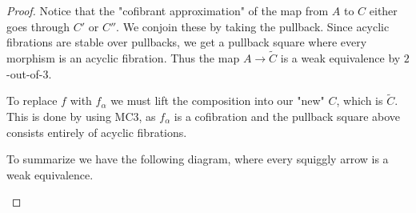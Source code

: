 \documentclass[../thesis.tex]{subfiles}
\begin{document}
\begin{proof}
                Notice that the "cofibrant approximation" of the map from $A$ to $C$ either goes through $C'$ or $C''$. We conjoin these by taking the pullback. Since acyclic fibrations are stable over pullbacks, we get a pullback square where every morphism is an acyclic fibration. Thus the map $A\rightarrow \widetilde{C}$ is a weak equivalence by $2$-out-of-$3$.
                \begin{center}
                \end{center}

                To replace $f$ with $f_\alpha$ we must lift the composition into our "new" $C$, which is $\widetilde{C}$. This is done by using MC3, as $f_\alpha$ is a cofibration and the pullback square above consists entirely of acyclic fibrations.
                \begin{center}
                \end{center}

                To summarize we have the following diagram, where every squiggly arrow is a weak equivalence.
                \begin{center}
                \end{center}


\end{proof}
\end{document}
